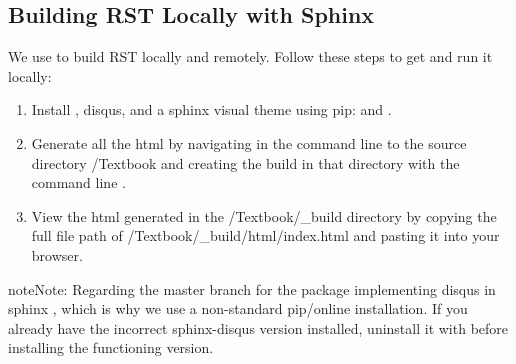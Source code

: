 \documentclass[letterpaper,10pt,english]{sphinxmanual}
\begin{document}
\subsection{Building RST Locally with Sphinx}
\label{\detokenize{Textbook_Creation_Help/rst_intro:building-rst-locally-with-sphinx}}\label{\detokenize{Textbook_Creation_Help/rst_intro:heading-building-rst-locally}}
We use  to build RST locally and remotely. Follow these steps to get  and run it locally:
\begin{enumerate}
\item {} 
Install , disqus, and a sphinx visual theme using pip:  and .

\item {} 
Generate all the html by navigating in the command line to the source directory /Textbook and creating the build in that directory with the command line .

\item {} 
View the html generated in the /Textbook/\_build directory by copying the full file path of /Textbook/\_build/html/index.html and pasting it into your browser.

\end{enumerate}

\begin{sphinxadmonition}{note}{Note:}
Regarding  the master branch for the package implementing disqus in sphinx , which is why we use a non-standard pip/online installation. If you already have the incorrect sphinx-disqus version installed, uninstall it with  before installing the functioning version.
\end{sphinxadmonition}
\end{document}
